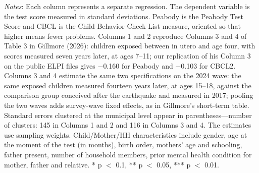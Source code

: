 \begin{table}[htbp]
\begin{minipage}{460pt}
{\textit{Notes}: Each column represents a separate regression. The dependent variable is the test score measured in standard deviations. Peabody is the Peabody Test Score and CBCL is the Child Behavior Check List measure, oriented so that higher means fewer problems. Columns 1 and 2 reproduce Columns 3 and 4 of Table 3 in Gillmore (2026): children exposed between in utero and age four, with scores measured seven years later, at ages 7--11; our replication of his Column 3 on the public ELPI files gives $-$0.160 for Peabody and $-$0.103 for CBCL2. Columns 3 and 4 estimate the same two specifications on the 2024 wave: the same exposed children measured fourteen years later, at ages 15--18, against the comparison group conceived after the earthquake and measured in 2017; pooling the two waves adds survey-wave fixed effects, as in Gillmore's short-term table. Standard errors clustered at the municipal level appear in parentheses---number of clusters: 145 in Columns 1 and 2 and 116 in Columns 3 and 4. The estimates use sampling weights. Child/Mother/HH characteristics include gender, age at the moment of the test (in months), birth order, mothers' age and schooling, father present, number of household members, prior mental health condition for mother, father and relative. * p $<$ 0.1, ** p $<$ 0.05, *** p $<$ 0.01.
\par}
\end{minipage}
\end{table}
